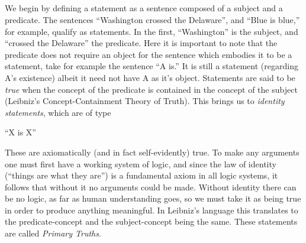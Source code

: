\documentclass{article}
\title{
        \textbf{\hmwkTitle}\\
        \normalsize\vspace{0.1in}\small{\hmwkDueDate}
        \author{\hmwkAuthorName}
    }
\date{}
\begin{document}
\maketitle
\pagebreak
We begin by defining a statement as a sentence composed of a subject and a predicate. The sentences ``Washington crossed the Delaware'', and ``Blue is blue,'' for example, qualify as statements. In the first, ``Washington'' is the subject, and ``crossed the Delaware'' the predicate. Here it is important to note that the predicate does not require an object for the sentence which embodies it to be a statement, take for example the sentence ``A is.'' It is still a statement (regarding A's existence) albeit it need not have A as it's object. Statements are said to be \emph{true} when the concept of the predicate is contained in the concept of the subject (Leibniz's Concept-Containment Theory of Truth). This brings us to \emph{identity statements}, which are of type

    \begin{center}
        ``X is X''
    \end{center}

\noindent These are axiomatically (and in fact self-evidently) true. To make any arguments one must first have a working system of logic, and since the law of identity (``things are what they are'') is a fundamental axiom in all logic systems, it follows that without it no arguments could be made. Without identity there can be no logic, as far as human understanding goes, so we must take it as being true in order to produce anything meaningful. In Leibniz's language this translates to the predicate-concept and the subject-concept being the same. These statements are called \emph{Primary Truths}.
\end{document}
